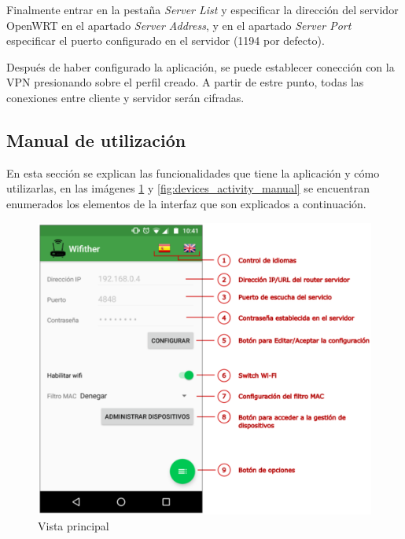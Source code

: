 \documentclass[12pt]{article}
\begin{document}
\begin{enumerate}
                Finalmente entrar en la pestaña \textit{Server List} y especificar la dirección del servidor OpenWRT en el apartado \textit{Server Address}, y en el apartado \textit{Server Port} especificar el puerto configurado en el servidor (1194 por defecto).

                Después de haber configurado la aplicación, se puede establecer conección con la VPN presionando sobre el perfil creado. A partir de estre punto, todas las conexiones entre cliente y servidor serán cifradas.
            \end{enumerate}

    \subsection{Manual de utilización}
        En esta sección se explican las funcionalidades que tiene la aplicación y cómo utilizarlas, en las imágenes \ref{fig:main_activity_manual} y \ref{fig:devices_activity_manual} se encuentran enumerados los elementos de la interfaz que son explicados a continuación.

        \begin{figure}[h!]
            \centering
                \includegraphics[scale=0.5]{main_activity_manual.eps}
                \caption{Vista principal}
                \label{fig:main_activity_manual}
        \end{figure}
\end{document}
